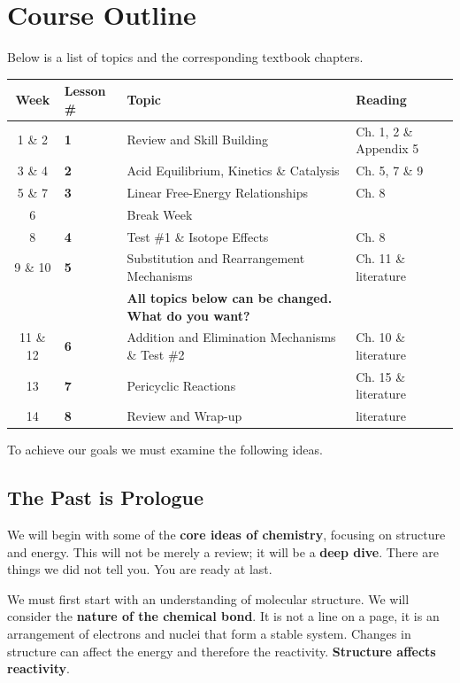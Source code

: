 \section{Course Outline}

Below is a list of topics and the corresponding textbook chapters.

\begin{table}[h]
\centering
\begin{tabular}{cllp{4cm}}
\toprule
Week & Lesson \# & Topic & Reading \\
\midrule
1 \& 2  & \textbf{1} & Review and Skill Building & Ch. 1, 2 \& Appendix 5 \\
3 \& 4  & \textbf{2} & Acid Equilibrium, Kinetics \& Catalysis & Ch. 5, 7 \& 9 \\
5 \& 7  & \textbf{3} & Linear Free-Energy Relationships & Ch. 8 \\
6        &           & Break Week & \\
8        & \textbf{4} & Test \#1 \& Isotope Effects & Ch. 8 \\
9 \& 10 & \textbf{5} & Substitution and Rearrangement Mechanisms & Ch. 11 \& literature \\
          &           & \textbf{All topics below can be changed. What do you want?} & \\
11 \& 12 & \textbf{6} & Addition and Elimination Mechanisms \& Test \#2 & Ch. 10 \& literature \\
13       & \textbf{7} & Pericyclic Reactions & Ch. 15 \& literature \\
14       & \textbf{8} & Review and Wrap-up & literature \\
\bottomrule
\end{tabular}
\end{table}

\bigskip To achieve our goals we must examine the following ideas.

\subsection{The Past is Prologue}

We will begin with some of the \textbf{core ideas of chemistry}, focusing on structure and energy. This will not be merely a review; it will be a \textbf{deep dive}. There are things we did not tell you. You are ready at last.

We must first start with an understanding of molecular structure. We will consider the \textbf{nature of the chemical bond}. It is not a line on a page, it is an arrangement of electrons and nuclei that form a stable system. Changes in structure can affect the energy and therefore the reactivity. \textbf{Structure affects reactivity}.

